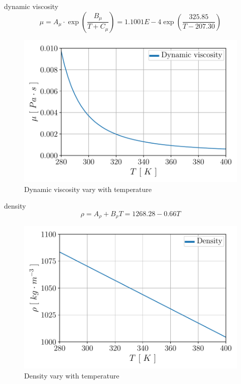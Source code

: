 \documentclass[12pt,oneside]{jbook}
\begin{document}
dynamic viscosity
\begin{equation}
	\mu = A_{\mu}\cdot \exp \left( \frac{B_{\mu}}{T+C_{\mu}} \right) = 1.1001E-4\exp \left( \frac{325.85}{T-207.30} \right)
	\label{mu}
\end{equation}
\begin{figure}[ht]
	\vspace{0zh}
	\begin{center}
		\includegraphics[width=0.65\linewidth]{fig/mp_mu.pdf}
		\vspace{-1zh}
		\caption{Dynamic viscosity vary with temperature}
		\label{mu}
	\end{center}
	\vspace{0zh}
\end{figure}


density
\begin{equation}
	\rho = A_{\rho}+B_{\rho} T = 1268.28 -0.66T
	\label{rho}
\end{equation}
\begin{figure}[ht]
    \vspace{0zh}
	\begin{center}
		\includegraphics[width=0.65\linewidth]{fig/mp_rho.pdf}
		\vspace{-1zh}
		\caption{Density vary with temperature}
		\label{rho}
	\end{center}
	\vspace{0zh}
\end{figure}
\end{document}
